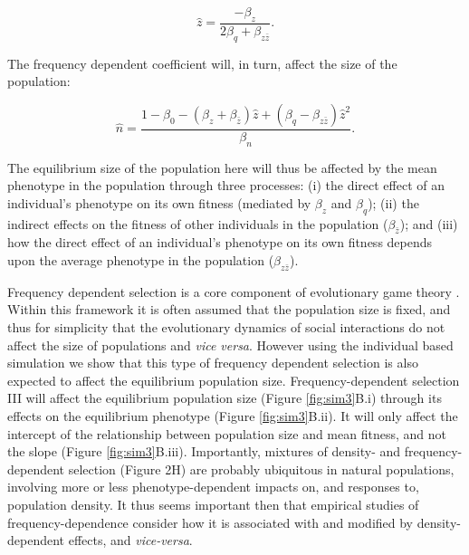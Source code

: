 \documentclass{article}
\begin{document}
\begin{equation} 
\hat{z}=\frac{-\beta_{z}}{2\beta_{q} + \beta_{z\bar{z}}}.
\end{equation} 

\noindent The frequency dependent coefficient will, in turn, affect the size of the population:

\begin{equation}
\hat{n} = \frac{1-\beta_{0}-(\beta_{z}   + \beta_{\bar{z}})\hat{z} + (\beta_{q} - \beta_{z\bar{z}})\hat{z}^2}{\beta_{n}}.
\end{equation}

\noindent The equilibrium size of the population here will thus be affected by the mean phenotype in the population through three processes: (i) the direct effect of an individual's phenotype on its own fitness (mediated by $\beta_z$ and $ \beta_q$); (ii) the indirect effects on the fitness of other individuals in the population ($\beta_{\bar{z}}$); and (iii) how the direct effect of an individual's phenotype on its own fitness depends upon the average phenotype in the population ($\beta_{z\bar{z}}$). 
 
 Frequency dependent selection is a core component of evolutionary game theory \citep{MaynardSmith1982}. Within this framework it is often assumed that the population size is fixed, and thus for simplicity that the evolutionary dynamics of social interactions do not affect the size of populations and  \textit{vice versa}. However using the individual based simulation we show that this type of frequency dependent selection is also expected to affect the equilibrium population size. Frequency-dependent selection III will affect the equilibrium population size (Figure \ref{fig:sim3}B.i) through its effects on the equilibrium phenotype (Figure \ref{fig:sim3}B.ii). It will only affect the intercept of the relationship between population size and mean fitness, and not the slope (Figure \ref{fig:sim3}B.iii). Importantly, mixtures of density- and frequency-dependent selection (Figure 2H) are probably ubiquitous in natural populations, involving more or less phenotype-dependent impacts on, and responses to, population density. It thus seems important then that empirical studies of frequency-dependence consider how it is associated with and modified by density-dependent effects, and \textit{vice-versa}.
\end{document}
